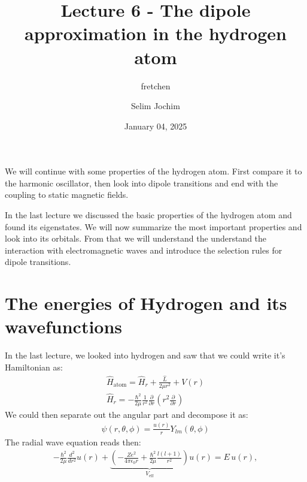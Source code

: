 \documentclass[10pt]{article}
\let\cite\citep
\renewenvironment{abstract}
  {{\bfseries\noindent{\abstractname}\par\nobreak}\footnotesize}
  {\bigskip}
\providecommand\citep{\cite}
\begin{document}
\title{Lecture 6 - The dipole approximation in the hydrogen atom}



\author[1]{fretchen}%
\author[2]{Selim Jochim}%
%
%


\vspace{-1em}



  
  \date{January 04, 2025}


\begingroup
\let\center\flushleft
\let\endcenter\endflushleft
\maketitle
\endgroup





\begin{abstract}
We will continue with some properties of the hydrogen atom. First compare it to the harmonic oscillator, then look into dipole transitions and end with the coupling to static magnetic fields.%
\end{abstract}%



\sloppy


In the last lecture \cite{atom} we discussed the basic properties of the hydrogen atom and found its eigenstates. We will now summarize the most important properties and look into its orbitals. From that we will understand the understand the interaction with electromagnetic waves and introduce the selection rules for dipole transitions.

\section{The energies of Hydrogen and its wavefunctions}
In the last lecture, we looked into hydrogen and saw that we could write it's Hamiltonian as:
\begin{align}
\hat{H}_\text{atom} = \hat{H}_r + \frac{\hat{L}}{2\mu r^2}+V(r) \\
\hat{H}_r = -\frac{\hbar^2}{2\mu}\frac{1}{r^2}\frac{\partial}{\partial r}\left(r^2\frac{\partial}{\partial r}\right)
\end{align}
We could then separate out the angular part and decompose it as:
\begin{align}
\psi (r,\theta,\phi) = \frac{u(r)}{r} Y_{lm}(\theta,\phi)
\end{align}
The radial wave equation reads then:
\begin{align}\label{Eq:RadWF}
-\frac{\hbar^2}{2\mu}\frac{d^2}{dr^2}u(r) +\underbrace{ \left( -\frac{Ze^2}{4\pi\epsilon_0 r} + \frac{\hbar^2}{2\mu} \frac{l(l+1)}{r^2} \right)}_{V_{\text{eff}}} u(r) = E \, u(r),\end{align}
\end{document}
